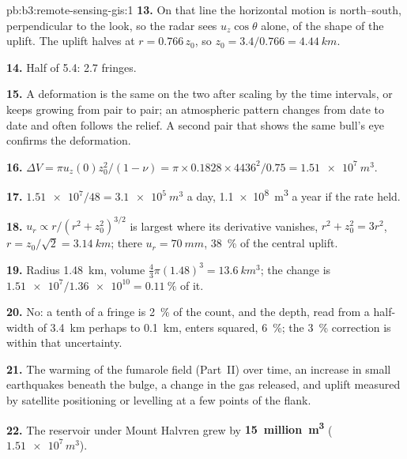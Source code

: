 \begin{solution}{pb:b3:remote-sensing-gis:1}
\textbf{13.} On that line the horizontal motion is north--south,
perpendicular to the look, so the radar sees $u_z\cos\theta$ alone, of the
shape of the uplift. The uplift halves at $r = 0.766\,z_0$, so $z_0 =
3.4/0.766 = \qty{4.44}{km}$.

\textbf{14.} Half of 5.4: 2.7 fringes.

\textbf{15.} A deformation is the same on the two  after
scaling by the time intervals, or keeps growing from pair to pair; an
atmospheric pattern changes from date to date and often follows the
relief. A second pair that shows the same bull's eye confirms the
deformation.

\textbf{16.} $\Delta V = \pi u_z(0)z_0^2/(1 - \nu) = \pi\times0.1828\times
4436^2/0.75 = \qty{1.51e7}{m^3}$.

\textbf{17.} $\num{1.51e7}/48 = \qty{3.1e5}{m^3}$ a day, \qty{1.1e8}{m^3}
a year if the rate held.

\textbf{18.} $u_r \propto r/(r^2 + z_0^2)^{3/2}$ is largest where its
derivative vanishes, $r^2 + z_0^2 = 3r^2$, $r = z_0/\sqrt2 = \qty{3.14}{km}$;
there $u_r = \qty{70}{mm}$, \qty{38}{\percent} of the central uplift.

\textbf{19.} Radius \qty{1.48}{km}, volume $\frac43\pi(1.48)^3 =
\qty{13.6}{km^3}$; the change is $\num{1.51e7}/\num{1.36e10} =
\qty{0.11}{\percent}$ of it.

\textbf{20.} No: a tenth of a fringe is \qty{2}{\percent} of the count, and
the depth, read from a half-width of \qty{3.4}{km} perhaps to
\qty{0.1}{km}, enters squared, \qty{6}{\percent}; the \qty{3}{\percent}
correction is within that uncertainty.

\textbf{21.} The warming of the fumarole field (Part~II) over time, an
increase in small earthquakes beneath the bulge, a change in the gas
released, and uplift measured by satellite positioning or levelling at a
few points of the flank.

\textbf{22.} The reservoir under Mount Halvren grew by
\textbf{15~million~\unit[text-series-to-math=true]{m^3}} ($\num{1.51e7}\,\unit{m^3}$).
\end{solution}
